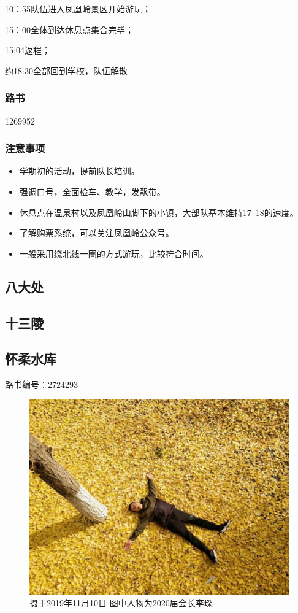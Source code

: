 \documentclass{ctexbook}
\begin{document}
10：55队伍进入凤凰岭景区开始游玩；

15：00全体到达休息点集合完毕；

15:04返程；

约18:30全部回到学校，队伍解散

\subsubsection{路书}
1269952
\subsubsection{注意事项}
\begin{itemize}
    \item 学期初的活动，提前队长培训。
    \item 强调口号，全面检车、教学，发飘带。
    \item 休息点在温泉村以及凤凰岭山脚下的小镇，大部队基本维持17~18的速度。
    \item 了解购票系统，可以关注凤凰岭公众号。
    \item 一般采用绕北线一圈的方式游玩，比较符合时间。
\end{itemize}
\subsection{八大处}
\subsection{十三陵}
\subsection{怀柔水库}
路书编号：2724293
\begin{figure}[ht]
    \centering
    \includegraphics[width=0.8 \textwidth]{fig/怀柔水库1.jpg}
    \caption{摄于2019年11月10日 图中人物为2020届会长李琛}
\end{figure}
\end{document}
